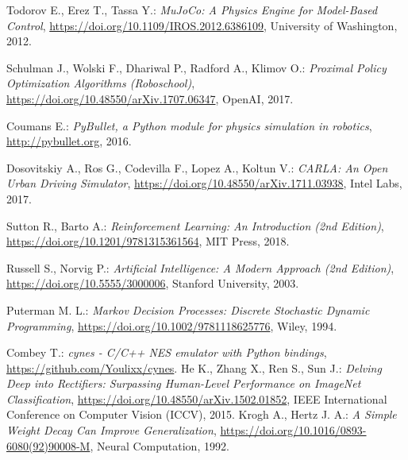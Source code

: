 \begin{thebibliography}{99}
	Todorov E., Erez T., Tassa Y.:
	\emph{MuJoCo: A Physics Engine for Model-Based Control},
	\url{https://doi.org/10.1109/IROS.2012.6386109},
	University of Washington, 2012.

	Schulman J., Wolski F., Dhariwal P., Radford A., Klimov O.:
	\emph{Proximal Policy Optimization Algorithms (Roboschool)},
	\url{https://doi.org/10.48550/arXiv.1707.06347},
	OpenAI, 2017.

	Coumans E.:
	\emph{PyBullet, a Python module for physics simulation in robotics},
	\url{http://pybullet.org},
	2016.

	Dosovitskiy A., Ros G., Codevilla F., Lopez A., Koltun V.:
	\emph{CARLA: An Open Urban Driving Simulator},
	\url{https://doi.org/10.48550/arXiv.1711.03938},
	Intel Labs, 2017.

	Sutton R., Barto A.:
	\emph{Reinforcement Learning: An Introduction (2nd Edition)},
	\url{https://doi.org/10.1201/9781315361564},
	MIT Press, 2018.

	Russell S., Norvig P.:
	\emph{Artificial Intelligence: A Modern Approach (2nd Edition)},
	\url{https://doi.org/10.5555/3000006},
	Stanford University, 2003.

	Puterman M. L.:
	\emph{Markov Decision Processes: Discrete Stochastic Dynamic Programming},
	\url{https://doi.org/10.1002/9781118625776},
	Wiley, 1994.

	Combey T.:
	\emph{cynes - C/C++ NES emulator with Python bindings},
	\url{https://github.com/Youlixx/cynes}.
	He K., Zhang X., Ren S., Sun J.:
	\emph{Delving Deep into Rectifiers: Surpassing Human-Level Performance on ImageNet Classification},
	\url{https://doi.org/10.48550/arXiv.1502.01852},
	IEEE International Conference on Computer Vision (ICCV), 2015.
	Krogh A., Hertz J. A.:
	\emph{A Simple Weight Decay Can Improve Generalization},
	\url{https://doi.org/10.1016/0893-6080(92)90008-M},
	Neural Computation, 1992.
\end{thebibliography}


